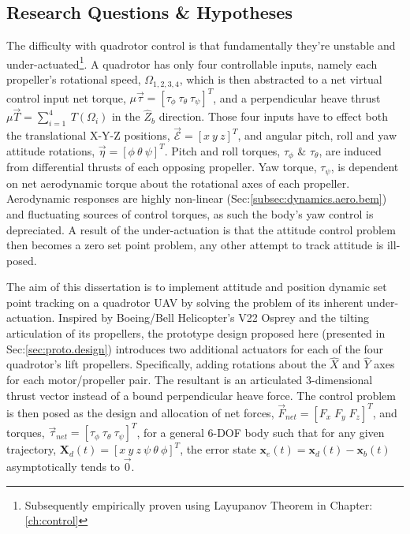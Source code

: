 \subsection{Research Questions \& Hypotheses}
\label{subsec:intro.foreword.hypotheses}
The difficulty with quadrotor control is that fundamentally they're unstable and under-actuated\footnote{Subsequently empirically proven using Layupanov Theorem in Chapter:\ref{ch:control}}. A quadrotor has only four controllable inputs, namely each propeller's rotational speed, $\Omega_{1,2,3,4}$, which is then abstracted to a net virtual control input net torque, $\mu\vec{\tau}=[\tau_{\phi}~\tau_{\theta}~\tau_{\psi}]^T$, and a perpendicular heave thrust $\mu\vec{T}=\sum_{i=1}^{4}~T(\Omega_i)$ in the $\hat{Z}_b$ direction. Those four inputs have to effect both the translational X-Y-Z positions, $\vec{\mathcal{E}}=[x~y~z]^T$, and angular pitch, roll and yaw attitude rotations, $\vec{\eta}=[\phi~\theta~\psi]^T$. Pitch and roll torques, $\tau_{\phi}$ \& $\tau_{\theta}$, are induced from differential thrusts of each opposing propeller. Yaw torque, $\tau_{\psi}$, is dependent on net aerodynamic torque about the rotational axes of each propeller. Aerodynamic responses are highly non-linear (Sec:\ref{subsec:dynamics.aero.bem}) and fluctuating sources of control torques, as such the body's yaw control is depreciated. A result of the under-actuation is that the attitude control problem then becomes a zero set point problem, any other attempt to track attitude is ill-posed.
\par
The aim of this dissertation is to implement attitude and position dynamic set point tracking on a quadrotor UAV by solving the problem of its inherent under-actuation. Inspired by Boeing/Bell Helicopter's V22 Osprey and the tilting articulation of its propellers, the prototype design proposed here (presented in Sec:\ref{sec:proto.design}) introduces two additional actuators for each of the four quadrotor's lift propellers. Specifically, adding rotations about the $\hat{X}$ and $\hat{Y}$ axes for each motor/propeller pair. The resultant is an articulated 3-dimensional thrust vector instead of a bound perpendicular heave force. The control problem is then posed as the design and allocation of net forces, $\vec{F}_{net} = [F_x\;F_y\;F_z]^T$, and torques, $\vec{\tau}_{net} = [\tau_{\phi}~\tau_{\theta}~\tau_{\psi}]^T$, for a general 6-DOF body such that for any given trajectory, $\mathbf{X}_d(t)=[x~y~z~\psi~\theta~\phi]^T$, the error state $\mathbf{x}_e(t) = \mathbf{x}_d(t) - \mathbf{x}_b(t)$ asymptotically tends to $\vec{0}$.
